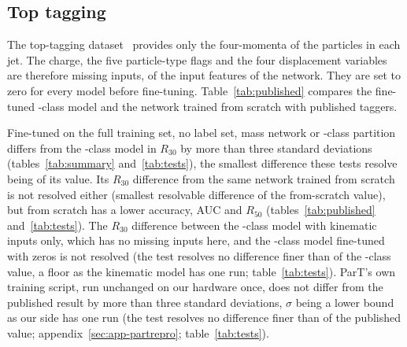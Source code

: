 
\subsection{Top tagging}\label{sec:top}

The top-tagging dataset~\cite{toptag} provides only the four-momenta of the particles in each jet. The
charge, the five particle-type flags and the four displacement variables are therefore missing inputs,
\FillTopNZero{} of the \FillNFeatures{} input features of the network. They are set to zero for every model
before fine-tuning. Table~\ref{tab:published} compares the fine-tuned \Kfull-class model and the network trained from scratch with
published taggers.



Fine-tuned on the full training set, no label set, mass network or \Kcoarse-class partition differs from the
\Kfull-class model in $R_{30}$ by more than three standard deviations (tables~\ref{tab:summary} and~\ref{tab:tests}), the smallest difference these tests resolve
being \MlstPwRthirtyFtTop{} of its value. Its $R_{30}$ difference from the same
network trained from scratch is not resolved either (smallest resolvable difference \MlstPwTopScratch{} of the
from-scratch value), but from scratch has a lower accuracy, AUC and $R_{50}$
(tables~\ref{tab:published} and~\ref{tab:tests}). The $R_{30}$ difference between the \Kfull-class model with kinematic
inputs only, which has no missing inputs here, and the \Kfull-class model fine-tuned with zeros is not resolved
(the test resolves no difference finer than \MlstPwTopKin{} of the \Kfull-class value, a floor as the kinematic
model has one run; table~\ref{tab:tests}). ParT's own training script, run unchanged on our hardware once, does not differ from the
published result by more than three standard deviations, $\sigma$ being a lower bound as our side has one run (the test resolves no difference
finer than \MlstPwPartRepro{} of the published value; appendix~\ref{sec:app-partrepro}; table~\ref{tab:tests}).

